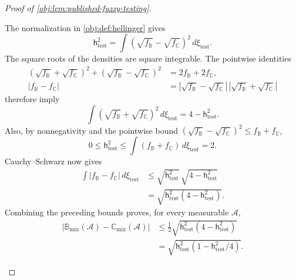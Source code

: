 \begin{proof}[Proof of \cref{obj:lem:published-fuzzy-testing}]
\begin{enumerate}
The normalization in \cref{obj:def:hellinger} gives
\[
\mathsf h_{\mathrm{test}}^2
=\int(\sqrt{f_{\mathbb B}}-\sqrt{f_{\mathbb C}})^2\,d\xi_{\mathrm{test}}.
\]
The square roots of the densities are square integrable. The pointwise identities
\[
\begin{aligned}
(\sqrt{f_{\mathbb B}}+\sqrt{f_{\mathbb C}})^2
+(\sqrt{f_{\mathbb B}}-\sqrt{f_{\mathbb C}})^2
&=2f_{\mathbb B}+2f_{\mathbb C},\\
|f_{\mathbb B}-f_{\mathbb C}|
&=|\sqrt{f_{\mathbb B}}-\sqrt{f_{\mathbb C}}|\,
  |\sqrt{f_{\mathbb B}}+\sqrt{f_{\mathbb C}}|
\end{aligned}
\]
therefore imply
\[
\int(\sqrt{f_{\mathbb B}}+\sqrt{f_{\mathbb C}})^2\,d\xi_{\mathrm{test}}
=4-\mathsf h_{\mathrm{test}}^2.
\]
Also, by nonnegativity and the pointwise bound
\((\sqrt{f_{\mathbb B}}-\sqrt{f_{\mathbb C}})^2
\le f_{\mathbb B}+f_{\mathbb C}\),
\[
0\le\mathsf h_{\mathrm{test}}^2
\le\int(f_{\mathbb B}+f_{\mathbb C})\,d\xi_{\mathrm{test}}
=2.
\]
Cauchy--Schwarz now gives
\[
\begin{aligned}
\int|f_{\mathbb B}-f_{\mathbb C}|\,d\xi_{\mathrm{test}}
&\le
\sqrt{\mathsf h_{\mathrm{test}}^2}\,
\sqrt{4-\mathsf h_{\mathrm{test}}^2}\\
&=\sqrt{\mathsf h_{\mathrm{test}}^2
                 (4-\mathsf h_{\mathrm{test}}^2)}.
\end{aligned}
\]
Combining the preceding bounds proves, for every measurable \(\mathcal A\),
\[
\begin{aligned}
|\mathbb B_{\mathrm{mix}}(\mathcal A)
-\mathbb C_{\mathrm{mix}}(\mathcal A)|
&\le\frac12
 \sqrt{\mathsf h_{\mathrm{test}}^2(4-\mathsf h_{\mathrm{test}}^2)}\\
&=\sqrt{\mathsf h_{\mathrm{test}}^2
                   (1-\mathsf h_{\mathrm{test}}^2/4)}.
\end{aligned}
\]


\end{enumerate}
\end{proof}
